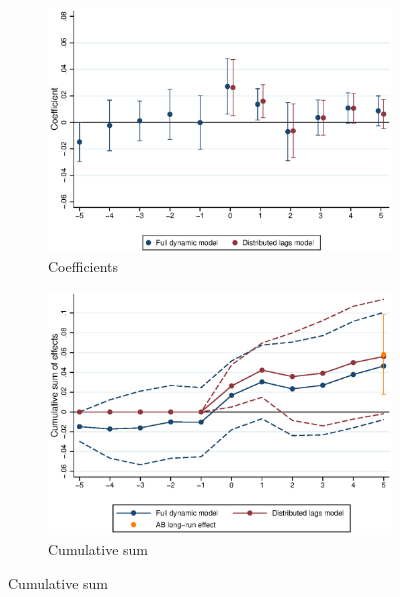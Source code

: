 \begin{figure}[htb!]
    \caption{The dynamic effects of MW increases on rents}
    \label{fig:dynamic_models_main}
    \centering
    \begin{subfigure}[b]{0.7\textwidth}
    	\caption{Coefficients}
    	\label{fig:dynamic_model_coeffs}
    	\includegraphics[width = \textwidth]
    	{../../analysis/first_differences/output/fd_models_coeffs_w5.eps}
    \end{subfigure}
    \begin{subfigure}[b]{0.7\textwidth}
    	\caption{Cumulative sum}
    	\label{fig:dynamic_model_cumsum}
    	\includegraphics[width = \textwidth]
    	{../../analysis/first_differences/output/fd_models_cumsum.eps}
    \end{subfigure}
    \begin{minipage}{0.95\textwidth} \footnotesize

\end{minipage}
\end{figure}
